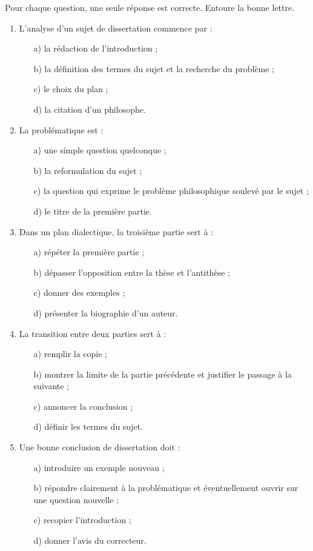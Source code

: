 \documentclass[11pt]{article}
\begin{document}
\begin{exercice}
Pour chaque question, une seule réponse est correcte. Entoure la bonne lettre.
\begin{enumerate}
\item L'analyse d'un sujet de dissertation commence par :
\begin{enumerate}
\item[a)] la rédaction de l'introduction ;
\item[b)] la définition des termes du sujet et la recherche du problème ;
\item[c)] le choix du plan ;
\item[d)] la citation d'un philosophe.
\end{enumerate}
\item La problématique est :
\begin{enumerate}
\item[a)] une simple question quelconque ;
\item[b)] la reformulation du sujet ;
\item[c)] la question qui exprime le problème philosophique soulevé par le sujet ;
\item[d)] le titre de la première partie.
\end{enumerate}
\item Dans un plan dialectique, la troisième partie sert à :
\begin{enumerate}
\item[a)] répéter la première partie ;
\item[b)] dépasser l'opposition entre la thèse et l'antithèse ;
\item[c)] donner des exemples ;
\item[d)] présenter la biographie d'un auteur.
\end{enumerate}
\item La transition entre deux parties sert à :
\begin{enumerate}
\item[a)] remplir la copie ;
\item[b)] montrer la limite de la partie précédente et justifier le passage à la suivante ;
\item[c)] annoncer la conclusion ;
\item[d)] définir les termes du sujet.
\end{enumerate}
\item Une bonne conclusion de dissertation doit :
\begin{enumerate}
\item[a)] introduire un exemple nouveau ;
\item[b)] répondre clairement à la problématique et éventuellement ouvrir sur une question nouvelle ;
\item[c)] recopier l'introduction ;
\item[d)] donner l'avis du correcteur.
\end{enumerate}
\end{enumerate}
\end{exercice}
\end{document}
